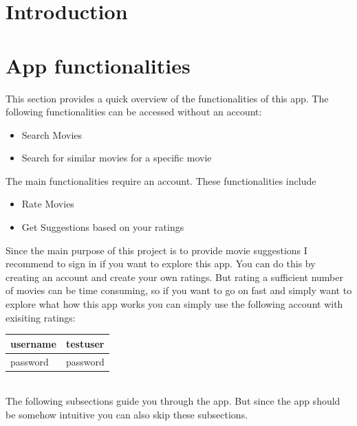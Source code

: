 \documentclass{article}
\begin{document}
\tableofcontents

\newpage


\section{Introduction}






\section{App functionalities}

This section provides a quick overview of the functionalities of this app. The following functionalities can be accessed without an account:

\begin{itemize}
	\item Search Movies
	\item Search for similar movies for a specific movie
\end{itemize}
The main functionalities require an account. These functionalities include

\begin{itemize}
	\item Rate Movies
	\item Get Suggestions based on your ratings
\end{itemize}
Since the main purpose of this project is to provide movie suggestions I recommend to sign in if you want to explore this app. You can do this by creating an account and create your own ratings. But rating a sufficient number of movies can be time consuming, so if you want to go on fast and simply want to explore what how this app works you can simply use the following account with exisiting ratings:\\

\begin{tabular}{|l|l|}
\hline
username & testuser \\
\hline password & password\\
\hline
\end{tabular}\\

The following subsections guide you through the app. But since the app should be somehow intuitive you can also skip these subsections.
\end{document}
